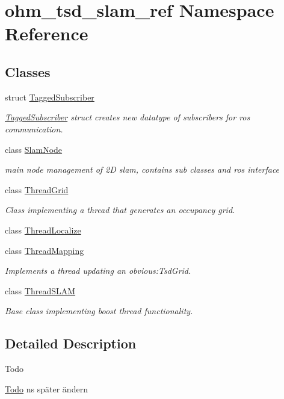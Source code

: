 \hypertarget{namespaceohm__tsd__slam__ref}{\section{ohm\-\_\-tsd\-\_\-slam\-\_\-ref Namespace Reference}
\label{namespaceohm__tsd__slam__ref}
}
\subsection*{Classes}
\begin{DoxyCompactItemize}
\item 
struct \hyperlink{structohm__tsd__slam__ref_1_1TaggedSubscriber}{Tagged\-Subscriber}
\begin{DoxyCompactList}\small\item\em \hyperlink{structohm__tsd__slam__ref_1_1TaggedSubscriber}{Tagged\-Subscriber} struct creates new datatype of subscribers for ros communication. \end{DoxyCompactList}\item 
class \hyperlink{classohm__tsd__slam__ref_1_1SlamNode}{Slam\-Node}
\begin{DoxyCompactList}\small\item\em main node management of 2\-D slam, contains sub classes and ros interface \end{DoxyCompactList}\item 
class \hyperlink{classohm__tsd__slam__ref_1_1ThreadGrid}{Thread\-Grid}
\begin{DoxyCompactList}\small\item\em Class implementing a thread that generates an occupancy grid. \end{DoxyCompactList}\item 
class \hyperlink{classohm__tsd__slam__ref_1_1ThreadLocalize}{Thread\-Localize}
\item 
class \hyperlink{classohm__tsd__slam__ref_1_1ThreadMapping}{Thread\-Mapping}
\begin{DoxyCompactList}\small\item\em Implements a thread updating an obvious\-:Tsd\-Grid. \end{DoxyCompactList}\item 
class \hyperlink{classohm__tsd__slam__ref_1_1ThreadSLAM}{Thread\-S\-L\-A\-M}
\begin{DoxyCompactList}\small\item\em Base class implementing boost thread functionality. \end{DoxyCompactList}\end{DoxyCompactItemize}


\subsection{Detailed Description}
\begin{DoxyRefDesc}{Todo}
\item[\hyperlink{todo__todo000007}{Todo}]ns später ändern \end{DoxyRefDesc}
